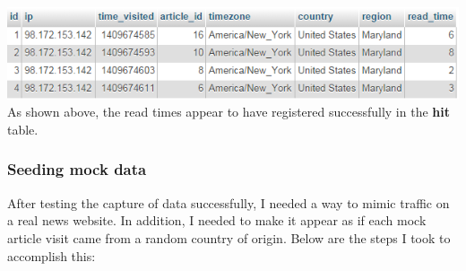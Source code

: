 \documentclass[12pt]{article}
\begin{document}
\noindent\includegraphics[scale=1]{img/results_hits} \\
\noindent As shown above, the read times appear to have registered successfully in the \textbf{hit} table. 

\subsubsection{Seeding mock data}
After testing the capture of data successfully, I needed a way to mimic traffic on a real news website. In addition, I needed to make it appear as if each mock article visit came from a random country of origin. Below are the steps I took to accomplish this:
\end{document}
